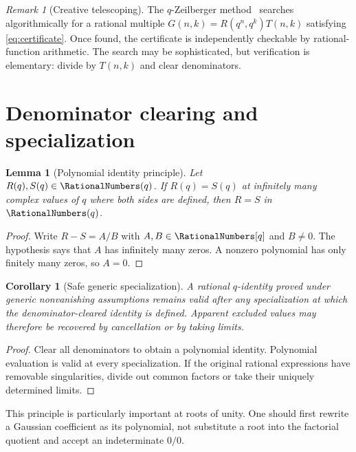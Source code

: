 \documentclass[11pt,a4paper,oneside,openany]{book}
\newtheorem{lemma}[lemma]{Lemma}
\newtheorem{corollary}[corollary]{Corollary}
\theoremstyle{definition}
\theoremstyle{remark}
\newtheorem{remark}[remark]{Remark}
\begin{document}
\begin{remark}[Creative telescoping]
The $q$-Zeilberger method~\cite{PetkovsekWilfZeilberger1996} searches algorithmically for a rational multiple $G(n,k)=R(q^n,q^k)T(n,k)$ satisfying \eqref{eq:certificate}.  Once found, the certificate is independently checkable by rational-function arithmetic.  The search may be sophisticated, but verification is elementary: divide by $T(n,k)$ and clear denominators.
\end{remark}

\section{Denominator clearing and specialization}

\begin{lemma}[Polynomial identity principle]\label{lem:polynomial-identity-principle}
Let $R(q),S(q)\in\RationalNumbers(q)$.  If $R(q)=S(q)$ at infinitely many complex values of $q$ where both sides are defined, then $R=S$ in $\RationalNumbers(q)$.
\end{lemma}

\begin{proof}
Write $R-S=A/B$ with $A,B\in\RationalNumbers[q]$ and $B\ne0$.  The hypothesis says that $A$ has infinitely many zeros.  A nonzero polynomial has only finitely many zeros, so $A=0$.
\end{proof}

\begin{corollary}[Safe generic specialization]\label{cor:safe-specialization}
A rational $q$-identity proved under generic nonvanishing assumptions remains valid after any specialization at which the denominator-cleared identity is defined.  Apparent excluded values may therefore be recovered by cancellation or by taking limits.
\end{corollary}

\begin{proof}
Clear all denominators to obtain a polynomial identity.  Polynomial evaluation is valid at every specialization.  If the original rational expressions have removable singularities, divide out common factors or take their uniquely determined limits.
\end{proof}

This principle is particularly important at roots of unity.  One should first rewrite a Gaussian coefficient as its polynomial, not substitute a root into the factorial quotient and accept an indeterminate $0/0$.
\end{document}
